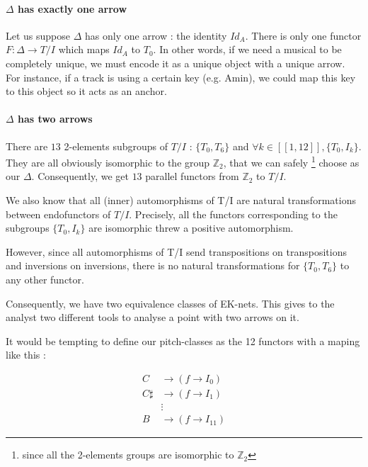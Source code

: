 \documentclass{report}
\begin{document}
\paragraph{$\Delta$ has exactly one arrow}
Let us suppose $\Delta$ has only one arrow : the identity $Id_A$. There is only one functor $F:\Delta \rightarrow T/I$ which maps $Id_A$ to $T_0$. In other words, if we need a musical to be completely unique, we must encode it as a unique object with a unique arrow. For instance, if a track is using a certain key (e.g. Amin), we could map this key to this object so it acts as an anchor.


\paragraph{$\Delta$ has two arrows}
There are $13$ 2-elements subgroups of $T/I$ : $\{T_0,T_6\}$ and $\forall k\in[\![1,12]\!], \{T_0,I_k\}$. They are all obviously isomorphic to the group $\mathbb{Z}_2$, that we can safely \footnote{ since all the 2-elements groups are isomorphic to $\mathbb{Z}_2$} choose as our $\Delta$. Consequently, we get $13$ parallel functors from $\mathbb{Z}_2$ to $T/I$.

We also know that all (inner) automorphisms of T/I are natural transformations between endofunctors of $T/I$. Precisely, all the functors corresponding to the subgroups $\{T_0,I_k\}$ are isomorphic threw a positive automorphism.

However, since all automorphisms of T/I send transpositions on transpositions and inversions on inversions, there is no natural transformations for $\{T_0,T_6\}$ to any other functor.

Consequently, we have two equivalence classes of EK-nets. This gives to the analyst two different tools to analyse a point with two arrows on it.

It would be tempting to define our pitch-classes as the 12 functors with a maping like this :


\begin{eqnarray*}
    C & \rightarrow (f \rightarrow I_0) \\
    C\sharp &\rightarrow (f \rightarrow I_1) \\
    &\vdots \\
    B & \rightarrow (f \rightarrow I_{11})
\end{eqnarray*}
\end{document}
